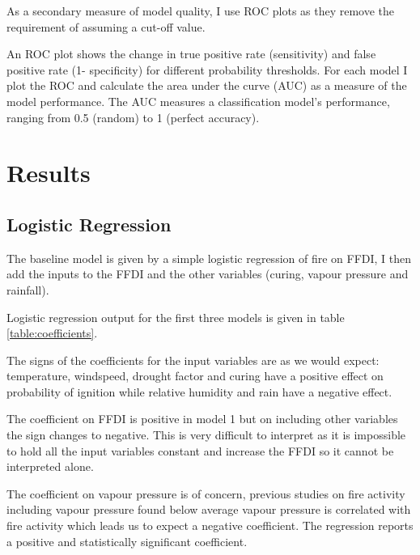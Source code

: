 \documentclass{article}
\begin{document}
 As a secondary measure of model quality, I use ROC plots as they remove the requirement of assuming a cut-off value. 

An ROC plot shows the change in true positive rate (sensitivity) and false positive rate (1- specificity) for different probability thresholds. For each model I plot the ROC and calculate the area under the curve (AUC) as a measure of the model performance. The AUC measures a classification model's performance, ranging from 0.5 (random) to 1 (perfect accuracy). 



\section{Results}

\subsection{Logistic Regression}

The baseline model is given by a simple logistic regression of fire on FFDI, I then add the inputs to the FFDI and  the other variables (curing, vapour pressure and rainfall). 

Logistic regression output for the first three models is given in table \ref{table:coefficients}. 

The signs of the coefficients for the input variables are as we would expect: temperature, windspeed, drought factor and curing have a positive effect on probability of ignition while relative humidity and rain have a negative effect. 


The coefficient on FFDI is positive in model 1 but on including other variables the  sign changes to negative. This is very difficult to interpret as it is impossible to hold all the input  variables constant and increase the FFDI so it cannot be interpreted alone. 

The coefficient on vapour pressure is of concern, previous studies on fire activity including vapour pressure \citep{harris14} found below average vapour pressure is correlated with fire activity which leads us to expect a negative coefficient. The regression reports a positive and statistically significant coefficient. 
\end{document}
